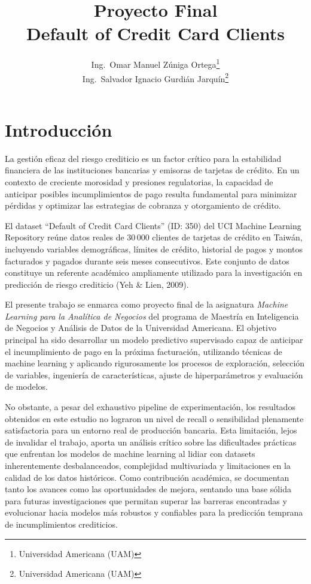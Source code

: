 \documentclass[journal]{apa7}
\title{Proyecto Final \\ Default of Credit Card Clients}
\author{%
  Ing.\ Omar Manuel Zúniga Ortega\thanks{Universidad Americana (UAM)} \\
  Ing.\ Salvador Ignacio Gurdián Jarquín\thanks{Universidad Americana (UAM)}%
}
\affiliation{Universidad Americana (UAM), Managua, Nicaragua}
\begin{document}
\maketitle


\section{Introducción}

La gestión eficaz del riesgo crediticio es un factor crítico para la estabilidad financiera de las instituciones bancarias y emisoras de tarjetas de crédito. En un contexto de creciente morosidad y presiones regulatorias, la capacidad de anticipar posibles incumplimientos de pago resulta fundamental para minimizar pérdidas y optimizar las estrategias de cobranza y otorgamiento de crédito.

El dataset \enquote{Default of Credit Card Clients} (ID: 350) del UCI Machine Learning Repository reúne datos reales de 30\,000 clientes de tarjetas de crédito en Taiwán, incluyendo variables demográficas, límites de crédito, historial de pagos y montos facturados y pagados durante seis meses consecutivos. Este conjunto de datos constituye un referente académico ampliamente utilizado para la investigación en predicción de riesgo crediticio (Yeh \& Lien, 2009).

El presente trabajo se enmarca como proyecto final de la asignatura \textit{Machine Learning para la Analítica de Negocios} del programa de Maestría en Inteligencia de Negocios y Análisis de Datos de la Universidad Americana. El objetivo principal ha sido desarrollar un modelo predictivo supervisado capaz de anticipar el incumplimiento de pago en la próxima facturación, utilizando técnicas de machine learning y aplicando rigurosamente los procesos de exploración, selección de variables, ingeniería de características, ajuste de hiperparámetros y evaluación de modelos.

No obstante, a pesar del exhaustivo pipeline de experimentación, los resultados obtenidos en este estudio no lograron un nivel de recall o sensibilidad plenamente satisfactoria para un entorno real de producción bancaria. Esta limitación, lejos de invalidar el trabajo, aporta un análisis crítico sobre las dificultades prácticas que enfrentan los modelos de machine learning al lidiar con datasets inherentemente desbalanceados, complejidad multivariada y limitaciones en la calidad de los datos históricos. Como contribución académica, se documentan tanto los avances como las oportunidades de mejora, sentando una base sólida para futuras investigaciones que permitan superar las barreras encontradas y evolucionar hacia modelos más robustos y confiables para la predicción temprana de incumplimientos crediticios.
\end{document}
